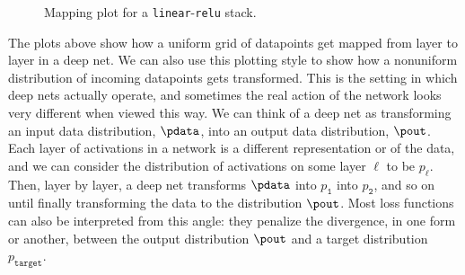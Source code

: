 \begin{figure}[h]
{
}
\caption{Mapping plot for a \texttt{linear}-\texttt{relu} stack.}
\label{fig:neural_nets_as_distribution_transformers:new_way_plot_two_layer}
\end{figure}

The plots above show how a uniform grid of datapoints get mapped from layer to layer in a deep net. We can also use this plotting style to show how a nonuniform distribution of incoming datapoints gets transformed. This is the setting in which deep nets actually operate, and sometimes the real action of the network looks very different when viewed this way. We can think of a deep net as transforming an input data distribution, $\pdata$, into an output data distribution, $\pout$. Each layer of activations in a network is a different representation or  of the data, and we can consider the distribution of activations on some layer $\ell$ to be $p_{\ell}$. Then, layer by layer, a deep net transforms $\pdata$ into $p_{\texttt{1}}$ into $p_{\texttt{2}}$, and so on until finally transforming the data to the distribution $\pout$. Most loss functions can also be interpreted from this angle: they penalize the divergence, in one form or another, between the output distribution $\pout$ and a target distribution $p_{\texttt{target}}$.

